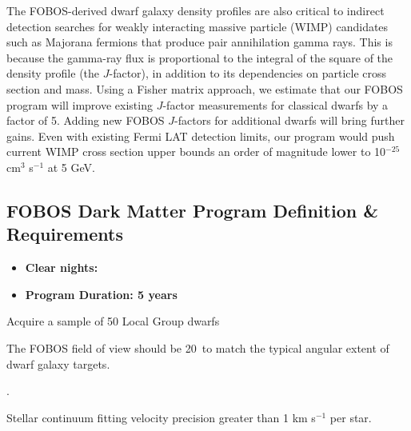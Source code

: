 \documentclass[11pt,a4paper,twoside,onecolumn,openany,final,oldfontcommands]{memoir}
\begin{document}
The FOBOS-derived dwarf galaxy density profiles are also critical to indirect detection searches for weakly interacting massive particle (WIMP) candidates such as Majorana fermions that produce pair annihilation gamma rays.  This is because the gamma-ray flux is proportional to the integral of the square of the density profile (the $J$-factor), in addition to its dependencies on particle cross section and mass.  Using a Fisher matrix approach, we estimate that our FOBOS program will improve existing $J$-factor measurements for classical dwarfs by a factor of 5.  Adding new FOBOS $J$-factors for additional dwarfs will bring further gains.  Even with existing Fermi LAT detection limits, our program would push current WIMP cross section upper bounds an order of magnitude lower to 10$^{-25}$ cm$^3$ s$^{-1}$ at 5 GeV.



\subsection{FOBOS Dark Matter Program Definition \& Requirements}

\medskip
\begin{itemize}[leftmargin=0.3in, itemsep=0pt]
	\item[] \textbf{Clear nights: }
	\item[] \textbf{Program Duration: 5 years}
\end{itemize}


\begin{programrequirement}

\reqitem Acquire a sample of 50 Local Group dwarfs 


\end{programrequirement}


\begin{sciencerequirement}

\reqitem The FOBOS field of view should be 20\arcmin\ to match the typical angular extent of dwarf galaxy targets.

\reqitem {}.

\reqitem Stellar continuum fitting velocity precision greater than 1 km s$^{-1}$ per star.
\end{sciencerequirement}
\end{document}
